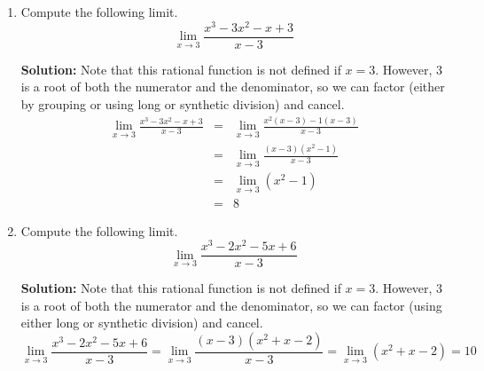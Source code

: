 \documentclass{article}
\begin{document}
\begin{enumerate}
  
\vspace{1cm}

\item Compute the following limit. \[ \lim_{x \rightarrow 3} \frac{x^3 - 3x^2 - x + 3}{x - 3} \]

\textbf{Solution:} Note that this rational function is not defined if $x = 3$. However, $3$ is a root of both the numerator and the denominator, so we can factor (either by grouping or using long or synthetic division) and cancel.
\begin{eqnarray*}
\lim_{x \rightarrow 3} \frac{x^3 - 3x^2 - x + 3}{x - 3} & = & \lim_{x \rightarrow 3} \frac{x^2(x - 3) - 1(x - 3)}{x - 3} \\
 & = & \lim_{x \rightarrow 3} \frac{(x - 3)(x^2 - 1)}{x - 3} \\
 & = & \lim_{x \rightarrow 3} (x^2 - 1) \\
 & = & 8
\end{eqnarray*}


  
\vspace{1cm}

\item Compute the following limit. \[ \lim_{x \rightarrow 3} \frac{x^3 - 2x^2 - 5x + 6}{x - 3} \]

\textbf{Solution:} Note that this rational function is not defined if $x = 3$. However, $3$ is a root of both the numerator and the denominator, so we can factor (using either long or synthetic division) and cancel.
\[ \lim_{x \rightarrow 3} \frac{x^3 - 2x^2 - 5x + 6}{x - 3} = \lim_{x \rightarrow 3} \frac{(x - 3)(x^2 + x - 2)}{x - 3} = \lim_{x \rightarrow 3} (x^2 + x - 2) = 10 \]


  
\vspace{1cm}
\end{enumerate}
\end{document}
